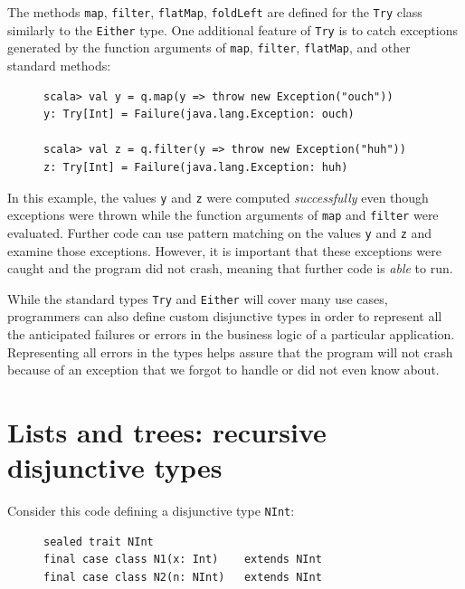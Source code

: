 The methods \lstinline!map!, \lstinline!filter!, \lstinline!flatMap!,
\lstinline!foldLeft! are defined for the \lstinline!Try! class similarly
to the \lstinline!Either! type. One additional feature of \lstinline!Try!
is to catch exceptions generated by the function arguments of \lstinline!map!,
\lstinline!filter!, \lstinline!flatMap!, and other standard methods:

\begin{figure}%
\vspace{-0.9\baselineskip}

\begin{lstlisting}
scala> val y = q.map(y => throw new Exception("ouch"))
y: Try[Int] = Failure(java.lang.Exception: ouch)

scala> val z = q.filter(y => throw new Exception("huh"))
z: Try[Int] = Failure(java.lang.Exception: huh)
\end{lstlisting}
\vspace{-0.9\baselineskip}
\end{figure}%

\noindent In this example, the values \lstinline!y! and \lstinline!z!
were computed \emph{successfully} even though exceptions were thrown
while the function arguments of \lstinline!map! and \lstinline!filter!
were evaluated. Further code can use pattern matching on the values
\lstinline!y! and \lstinline!z! and examine those exceptions. However,
it is important that these exceptions were caught and the program
did not crash, meaning that further code is \emph{able} to run. 

While the standard types \lstinline!Try! and \lstinline!Either!
will cover many use cases, programmers can also define custom disjunctive
types in order to represent all the anticipated failures or errors
in the business logic of a particular application. Representing all
errors in the types helps assure that the program will not crash because
of an exception that we forgot to handle or did not even know about.

\section{Lists and trees: recursive disjunctive types\label{sec:Lists-and-trees:recursive-disjunctive-types}}

Consider this code defining a disjunctive type \lstinline!NInt!:

\begin{figure}%
\vspace{-0.75\baselineskip}

\begin{lstlisting}
sealed trait NInt
final case class N1(x: Int)    extends NInt
final case class N2(n: NInt)   extends NInt
\end{lstlisting}
\vspace{-0.75\baselineskip}
\end{figure}%

